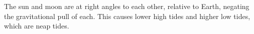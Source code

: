 \documentclass[11pt, addpoints]{exam}
\newcommand*\AnswerBox[2]{%
    \parbox[t][#1]{0.92\textwidth}{%
    \begin{solution}#2\end{solution}}
    \vspace{\stretch{1}}
}
\newlength{\basespace}
\begin{document}
\begin{questions}
\AnswerBox{0.3\textheight}{The sun and moon are at right angles to each other, relative to Earth, negating the gravitational pull of each. This causes lower high tides and higher low tides, which are neap tides.}

%

%
%
%
%
%

%





%


\end{questions}
\end{document}

